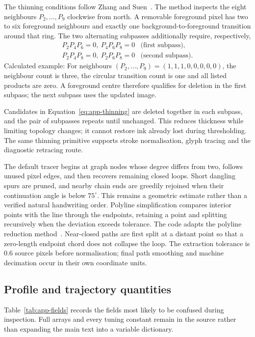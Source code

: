 The thinning conditions follow Zhang and Suen~\cite[p.~237]{zhang1984}. The method inspects the eight neighbours $P_2,\ldots,P_9$ clockwise from north. A removable foreground pixel has two to six foreground neighbours and exactly one background-to-foreground transition around that ring. The two alternating subpasses additionally require, respectively,
\begin{equation}
\begin{array}{ll}
P_2P_4P_6=0,\ P_4P_6P_8=0 &\text{(first subpass)},\\
P_2P_4P_8=0,\ P_2P_6P_8=0 &\text{(second subpass)}.
\end{array}
\label{eq:app-thinning}
\end{equation}
Calculated example: For neighbours $(P_2,\ldots,P_9)=(1,1,1,0,0,0,0,0)$, the neighbour count is three, the circular transition count is one and all listed products are zero. A foreground centre therefore qualifies for deletion in the first subpass; the next subpass uses the updated image. \cite[segment.py, Skeletonize]{braunepipeline2026}

Candidates in Equation~\ref{eq:app-thinning} are deleted together in each subpass, and the pair of subpasses repeats until unchanged. This reduces thickness while limiting topology changes; it cannot restore ink already lost during thresholding. The same thinning primitive supports stroke normalisation, glyph tracing and the diagnostic retracing route.~\cite[train.py; segment.py; style.py]{braunepipeline2026}

The default tracer begins at graph nodes whose degree differs from two, follows unused pixel edges, and then recovers remaining closed loops. Short dangling spurs are pruned, and nearby chain ends are greedily rejoined when their continuation angle is below $75^\circ$. This remains a geometric estimate rather than a verified natural handwriting order. Polyline simplification compares interior points with the line through the endpoints, retaining a point and splitting recursively when the deviation exceeds tolerance. The code adapts the polyline reduction method~\cite[page to verify]{douglas1973}. Near-closed paths are first split at a distant point so that a zero-length endpoint chord does not collapse the loop. The extraction tolerance is 0.6 source pixels before normalisation; final path smoothing and machine decimation occur in their own coordinate units.~\cite[train.py; segment.py; style.py]{braunepipeline2026}

\subsection{Profile and trajectory quantities}
Table~\ref{tab:app-fields} records the fields most likely to be confused during inspection. Full arrays and every tuning constant remain in the source rather than expanding the main text into a variable dictionary.

